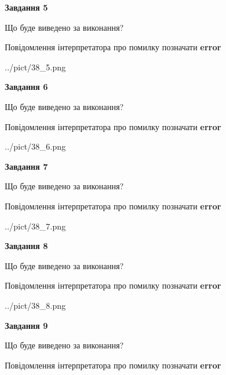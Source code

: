\documentclass[11pt, ukrainian]{article}
\begin{document}
{\begin {large}
{\begin {center}\textbf{Завдання 5}\end {center}}\par
Що буде виведено за виконання? \par
Повідомлення інтерпретатора про помилку позначати \textbf{error}

\begin{center}
	{../pict/38_5.png}
\end{center}
\newpage

{\begin {center}\textbf{Завдання 6}\end {center}}\par
Що буде виведено за виконання? \par
Повідомлення інтерпретатора про помилку позначати \textbf{error}

\begin{center}
	{../pict/38_6.png}
\end{center}
\newpage

{\begin {center}\textbf{Завдання 7}\end {center}}\par
Що буде виведено за виконання? \par
Повідомлення інтерпретатора про помилку позначати \textbf{error}

\begin{center}
	{../pict/38_7.png}
\end{center}
\newpage

{\begin {center}\textbf{Завдання 8}\end {center}}\par
Що буде виведено за виконання? \par
Повідомлення інтерпретатора про помилку позначати \textbf{error}

\begin{center}
	{../pict/38_8.png}
\end{center}
\newpage

{\begin {center}\textbf{Завдання 9}\end {center}}\par
Що буде виведено за виконання? \par
Повідомлення інтерпретатора про помилку позначати \textbf{error}


\end{large}}
\end{document}
